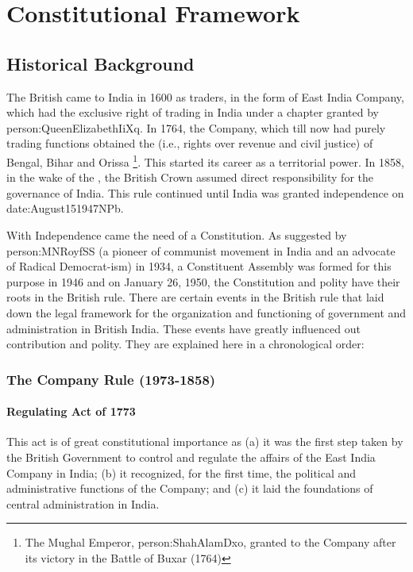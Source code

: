 \thispagestyle{empty}
\part{Constitutional Framework}
\restoregeometry
\cleardoublepage

\chapter{Historical Background}

The British came to India in 1600 as traders, in the form of East India Company, which had the exclusive right of trading in India under a chapter granted by \gls{person:QueenElizabethIiXq}. In 1764, the Company, which till now had purely trading functions obtained the \hspace{4pt}(i.e., rights over revenue and civil justice) of Bengal, Bihar and Orissa
\footnote{The Mughal Emperor, \gls{person:ShahAlamDxo}, granted  to the Company after its victory in the Battle of Buxar (1764)}. This started its career as a territorial power. In 1858, in the wake of the , the British Crown assumed direct responsibility for the governance of India. This rule continued until India was granted independence on \gls{date:August151947NPb}.

With Independence came the need of a Constitution. As suggested by \gls{person:MNRoyfSS} (a pioneer of communist movement in India and an advocate of Radical Democrat-ism) in 1934, a Constituent Assembly was formed for this purpose in 1946 and on January 26, 1950, the Constitution and polity have their roots in the British rule. There are certain events in the British rule that laid down the legal framework for the organization and functioning of government and administration in British India. These events have greatly influenced out contribution and polity. They are explained here in a chronological order:

\section{The Company Rule (1973-1858)}

\subsection{Regulating Act of 1773}
This act is of great constitutional importance as (a) it was the first step taken by the British Government to control and regulate the affairs of the East India Company in India; (b) it recognized, for the first time, the political and administrative functions of the Company; and (c) it laid the foundations of central administration in India.

